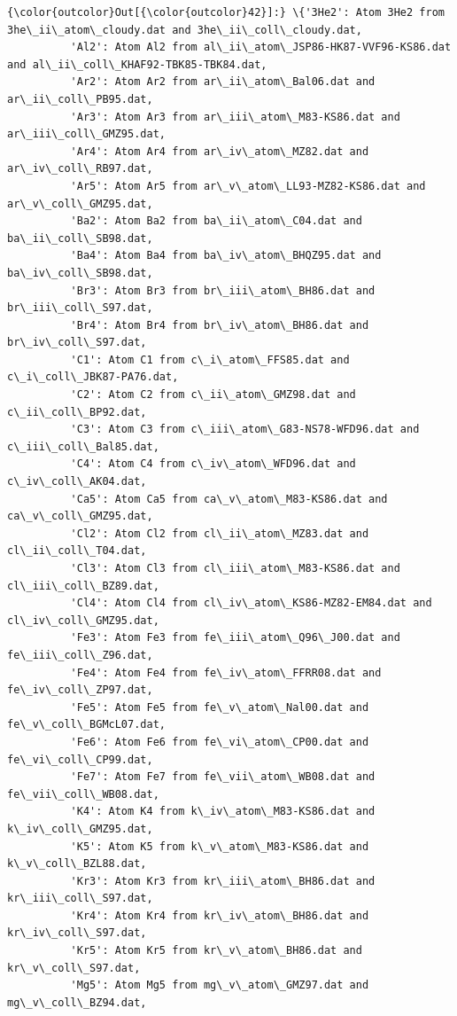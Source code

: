 \documentclass{report}
\begin{document}
            \begin{Verbatim}[commandchars=\\\{\}]
{\color{outcolor}Out[{\color{outcolor}42}]:} \{'3He2': Atom 3He2 from 3he\_ii\_atom\_cloudy.dat and 3he\_ii\_coll\_cloudy.dat,
          'Al2': Atom Al2 from al\_ii\_atom\_JSP86-HK87-VVF96-KS86.dat and al\_ii\_coll\_KHAF92-TBK85-TBK84.dat,
          'Ar2': Atom Ar2 from ar\_ii\_atom\_Bal06.dat and ar\_ii\_coll\_PB95.dat,
          'Ar3': Atom Ar3 from ar\_iii\_atom\_M83-KS86.dat and ar\_iii\_coll\_GMZ95.dat,
          'Ar4': Atom Ar4 from ar\_iv\_atom\_MZ82.dat and ar\_iv\_coll\_RB97.dat,
          'Ar5': Atom Ar5 from ar\_v\_atom\_LL93-MZ82-KS86.dat and ar\_v\_coll\_GMZ95.dat,
          'Ba2': Atom Ba2 from ba\_ii\_atom\_C04.dat and ba\_ii\_coll\_SB98.dat,
          'Ba4': Atom Ba4 from ba\_iv\_atom\_BHQZ95.dat and ba\_iv\_coll\_SB98.dat,
          'Br3': Atom Br3 from br\_iii\_atom\_BH86.dat and br\_iii\_coll\_S97.dat,
          'Br4': Atom Br4 from br\_iv\_atom\_BH86.dat and br\_iv\_coll\_S97.dat,
          'C1': Atom C1 from c\_i\_atom\_FFS85.dat and c\_i\_coll\_JBK87-PA76.dat,
          'C2': Atom C2 from c\_ii\_atom\_GMZ98.dat and c\_ii\_coll\_BP92.dat,
          'C3': Atom C3 from c\_iii\_atom\_G83-NS78-WFD96.dat and c\_iii\_coll\_Bal85.dat,
          'C4': Atom C4 from c\_iv\_atom\_WFD96.dat and c\_iv\_coll\_AK04.dat,
          'Ca5': Atom Ca5 from ca\_v\_atom\_M83-KS86.dat and ca\_v\_coll\_GMZ95.dat,
          'Cl2': Atom Cl2 from cl\_ii\_atom\_MZ83.dat and cl\_ii\_coll\_T04.dat,
          'Cl3': Atom Cl3 from cl\_iii\_atom\_M83-KS86.dat and cl\_iii\_coll\_BZ89.dat,
          'Cl4': Atom Cl4 from cl\_iv\_atom\_KS86-MZ82-EM84.dat and cl\_iv\_coll\_GMZ95.dat,
          'Fe3': Atom Fe3 from fe\_iii\_atom\_Q96\_J00.dat and fe\_iii\_coll\_Z96.dat,
          'Fe4': Atom Fe4 from fe\_iv\_atom\_FFRR08.dat and fe\_iv\_coll\_ZP97.dat,
          'Fe5': Atom Fe5 from fe\_v\_atom\_Nal00.dat and fe\_v\_coll\_BGMcL07.dat,
          'Fe6': Atom Fe6 from fe\_vi\_atom\_CP00.dat and fe\_vi\_coll\_CP99.dat,
          'Fe7': Atom Fe7 from fe\_vii\_atom\_WB08.dat and fe\_vii\_coll\_WB08.dat,
          'K4': Atom K4 from k\_iv\_atom\_M83-KS86.dat and k\_iv\_coll\_GMZ95.dat,
          'K5': Atom K5 from k\_v\_atom\_M83-KS86.dat and k\_v\_coll\_BZL88.dat,
          'Kr3': Atom Kr3 from kr\_iii\_atom\_BH86.dat and kr\_iii\_coll\_S97.dat,
          'Kr4': Atom Kr4 from kr\_iv\_atom\_BH86.dat and kr\_iv\_coll\_S97.dat,
          'Kr5': Atom Kr5 from kr\_v\_atom\_BH86.dat and kr\_v\_coll\_S97.dat,
          'Mg5': Atom Mg5 from mg\_v\_atom\_GMZ97.dat and mg\_v\_coll\_BZ94.dat,

\end{Verbatim}
\end{document}
